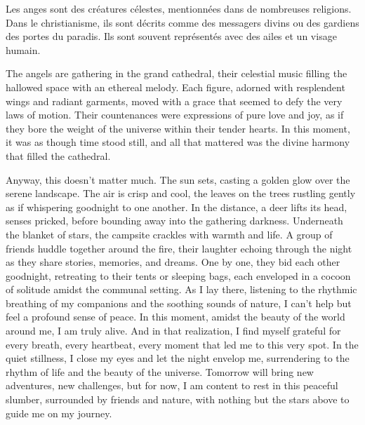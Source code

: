Les anges sont des créatures célestes, mentionnées dans de nombreuses religions. Dans le christianisme, ils sont décrits comme des messagers divins ou des gardiens des portes du paradis. Ils sont souvent représentés avec des ailes et un visage humain.

The angels are gathering in the grand cathedral, their celestial music filling the hallowed space with an ethereal melody. Each figure, adorned with resplendent wings and radiant garments, moved with a grace that seemed to defy the very laws of motion. Their countenances were expressions of pure love and joy, as if they bore the weight of the universe within their tender hearts. In this moment, it was as though time stood still, and all that mattered was the divine harmony that filled the cathedral.

Anyway, this doesn't matter much. The sun sets, casting a golden glow over the serene landscape. The air is crisp and cool, the leaves on the trees rustling gently as if whispering goodnight to one another. In the distance, a deer lifts its head, senses pricked, before bounding away into the gathering darkness. Underneath the blanket of stars, the campsite crackles with warmth and life. A group of friends huddle together around the fire, their laughter echoing through the night as they share stories, memories, and dreams. One by one, they bid each other goodnight, retreating to their tents or sleeping bags, each enveloped in a cocoon of solitude amidst the communal setting. As I lay there, listening to the rhythmic breathing of my companions and the soothing sounds of nature, I can't help but feel a profound sense of peace. In this moment, amidst the beauty of the world around me, I am truly alive. And in that realization, I find myself grateful for every breath, every heartbeat, every moment that led me to this very spot. In the quiet stillness, I close my eyes and let the night envelop me, surrendering to the rhythm of life and the beauty of the universe. Tomorrow will bring new adventures, new challenges, but for now, 
I am content to rest in this peaceful slumber, surrounded by friends and nature, with nothing but the stars above to guide me on my journey.
